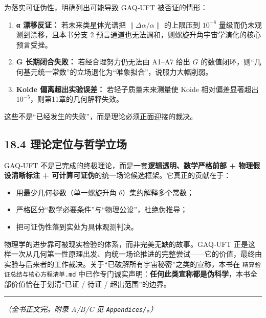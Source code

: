 为落实可证伪性，明确列出可能导致 GAQ‑UFT 被否证的情形：

\begin{enumerate}
\def\labelenumi{\arabic{enumi}.}
\tightlist
\item
  \textbf{α 漂移反证：} 若未来类星体光谱把 \(\|\Delta\alpha/\alpha\|\)
  的上限压到 \(10^{-8}\) 量级而仍未观测到漂移，且本书分支 2
  预言通道也无法调和，则螺旋升角宇宙学演化的核心预言受挫。
\item
  \textbf{G 长期闭合失败：} 若经合理努力仍无法由 A1--A7 给出 \(G\)
  的数值闭环，则``几何基元统一常数''的立场退化为``唯象拟合''，说服力大幅削弱。
\item
  \textbf{Koide 偏离超出实验误差：} 若轻子质量未来测量使 Koide
  相对偏差显著超出 \(10^{-5}\)，则第11章的几何解释失效。
\end{enumerate}

这些不是``已经发生的失败''，而是理论必须正面迎接的裁决。

\subsection{18.4
理论定位与哲学立场}\label{ux7406ux8bbaux5b9aux4f4dux4e0eux54f2ux5b66ux7acbux573a}

GAQ‑UFT 不是已完成的终极理论，而是一套\textbf{逻辑透明、数学严格前部 +
物理假设清晰标注 + 可计算可证伪}的统一场论候选框架。它真正的贡献在于：

\begin{itemize}
\tightlist
\item
  用最少几何参数（单一螺旋升角 \(\theta\)）集约解释多个常数；
\item
  严格区分``数学必要条件''与``物理公设''，杜绝伪推导；
\item
  把可证伪性落到实处为具体观测判决。
\end{itemize}

物理学的进步靠可被现实检验的体系，而非完美无缺的故事。GAQ‑UFT
正是这样一次从几何第一性原理出发、向统一场论推进的完整尝试------它的价值，最终由实验与后来者的工作裁决。关于``已破解所有宇宙秘密''之类的宣称，本书在
\texttt{精算验证总结与核心方程清单.md}
中已作专门诚实声明：\textbf{任何此类宣称都是伪科学}，本书全部价值恰在于划清``已证
/ 待证 / 超出范围''的边界。

\begin{center}\rule{0.5\linewidth}{0.5pt}\end{center}

\emph{（全书正文完。附录 A/B/C 见 \texttt{Appendices/}。）}
